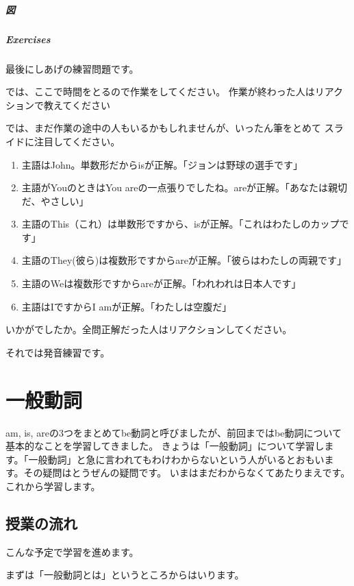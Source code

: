 \documentclass[book,jafontscale=0.9247]{jlreq}
\newcommand{\mySagyo}{%
\par%
\bigskip
では、ここで時間をとるので作業をしてください。
作業が終わった人はリアクションで教えてください\par%
\begin{minipage}[t]{.98\textwidth}
\mbox{}\hrulefill\mbox{}\par%
\mbox{}\hfill{}\raisebox{-.5\height}{作業}\hfill\mbox{}\par%
\mbox{}\hrulefill\mbox{}
\end{minipage}%
\par%
\bigskip%
では、まだ作業の途中の人もいるかもしれませんが、いったん筆をとめて
スライドに注目してください。%
\par%
\bigskip
}
\newcommand{\myMouse}{%
  {\large \ComputerMouse}
}
\begin{document}
\paragraph{図}

\paragraph{Exercises}

最後にしあげの練習問題です。

\mySagyo

\begin{enumerate}
 \item 主語はJohn。単数形だからisが正解。「ジョンは野球の選手です」
 \item 主語がYouのときはYou areの一点張りでしたね。areが正解。「あなたは親切だ、やさしい」
 \item 主語のThis（これ）は単数形ですから、isが正解。「これはわたしのカップです」
 \item 主語のThey(彼ら)は複数形ですからareが正解。「彼らはわたしの両親です」
 \item 主語のWeは複数形ですからareが正解。「われわれは日本人です」
 \item 主語はIですからI amが正解。「わたしは空腹だ」

\end{enumerate}

いかがでしたか。全問正解だった人はリアクションしてください。


それでは発音練習です。

\chapter{一般動詞}

am, is, areの3つをまとめてbe動詞と呼びましたが、前回まではbe動詞について基本的なことを学習してきました。
きょうは「一般動詞」について学習します。「一般動詞」と急に言われてもわけわからないという人がいるとおもいます。その疑問はとうぜんの疑問です。
いまはまだわからなくてあたりまえです。これから学習します。\myMouse

\section{授業の流れ}

こんな予定で学習を進めます。

まずは「一般動詞とは」というところからはいります。
\end{document}
